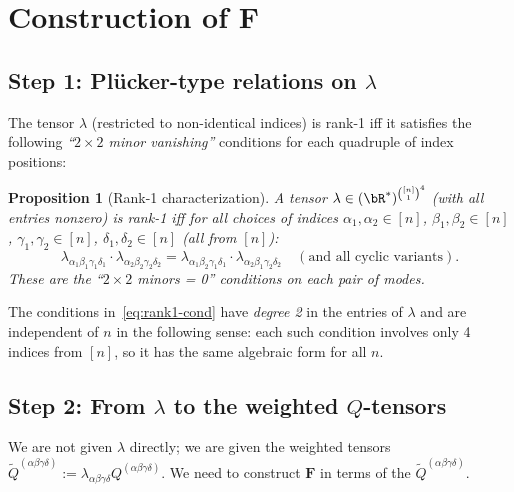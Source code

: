 \documentclass[12pt]{article}
\newtheorem{proposition}[theorem]{Proposition}
\begin{document}
\section*{Construction of $\mathbf{F}$}

\subsection*{Step 1: Pl\"{u}cker-type relations on $\lambda$}

The tensor $\lambda$ (restricted to non-identical indices) is rank-1 iff it satisfies the following \emph{``$2\times 2$ minor vanishing''} conditions for each quadruple of index positions:

\begin{proposition}[Rank-1 characterization]
  \label{prop:rank1}
  A tensor $\lambda\in(\bR^*)^{\binom{[n]}{1}^4}$ (with all entries nonzero) is rank-1 iff for all choices of indices $\alpha_1,\alpha_2\in[n]$, $\beta_1,\beta_2\in[n]$, $\gamma_1,\gamma_2\in[n]$, $\delta_1,\delta_2\in[n]$ (all from $[n]$):
  \begin{equation}
    \label{eq:rank1-cond}
    \lambda_{\alpha_1\beta_1\gamma_1\delta_1}\cdot\lambda_{\alpha_2\beta_2\gamma_2\delta_2}
    = \lambda_{\alpha_1\beta_2\gamma_1\delta_1}\cdot\lambda_{\alpha_2\beta_1\gamma_2\delta_2}
    \quad(\text{and all cyclic variants}).
  \end{equation}
  These are the ``$2\times 2$ minors = 0'' conditions on each pair of modes.
\end{proposition}

The conditions in~\eqref{eq:rank1-cond} have \emph{degree 2} in the entries of $\lambda$ and are independent of $n$ in the following sense: each such condition involves only 4 indices from $[n]$, so it has the same algebraic form for all $n$.

\subsection*{Step 2: From $\lambda$ to the weighted $Q$-tensors}

We are not given $\lambda$ directly; we are given the weighted tensors $\tilde{Q}^{(\alpha\beta\gamma\delta)} := \lambda_{\alpha\beta\gamma\delta} Q^{(\alpha\beta\gamma\delta)}$.  We need to construct $\mathbf{F}$ in terms of the $\tilde{Q}^{(\alpha\beta\gamma\delta)}$.
\end{document}
